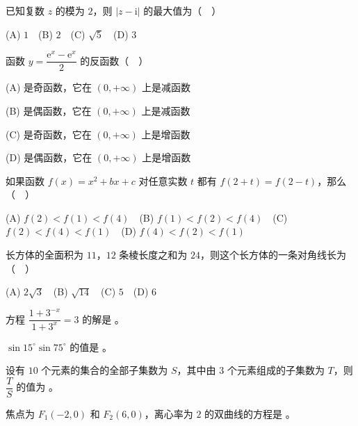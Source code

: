 \begin{question}
已知复数 \(z\) 的模为 \(2\)，则 \(|z-\mathrm{i}|\) 的最大值为（　）

(A) \(1\)　(B) \(2\)　(C) \(\sqrt{5}\)　(D) \(3\)

\end{question}
\begin{question}
函数 \(y=\dfrac{\mathrm{e}^{x}-\mathrm{e}^{x}}{2}\) 的反函数（　）

(A) 是奇函数，它在 \((0,+\infty)\) 上是减函数

(B) 是偶函数，它在 \((0,+\infty)\) 上是减函数

(C) 是奇函数，它在 \((0,+\infty)\) 上是增函数

(D) 是偶函数，它在 \((0,+\infty)\) 上是增函数

\end{question}
\begin{question}
如果函数 \(f(x)=x^{2}+bx+c\) 对任意实数 \(t\) 都有 \(f(2+t)=f(2-t)\)，那么（　）

(A) \(f(2)<f(1)<f(4)\)　(B) \(f(1)<f(2)<f(4)\)　(C) \(f(2)<f(4)<f(1)\)　(D) \(f(4)<f(2)<f(1)\)

\end{question}
\begin{question}
长方体的全面积为 \(11\)，\(12\) 条棱长度之和为 \(24\)，则这个长方体的一条对角线长为（　）

(A) \(2\sqrt{3}\)　(B) \(\sqrt{14}\)　(C) \(5\)　(D) \(6\)

\end{question}
\begin{question}
方程 \(\dfrac{1+3^{-x}}{1+3^{x}}=3\) 的解是 \underline{\qquad}。

\end{question}
\begin{question}
\(\sin 15^{\circ}\sin 75^{\circ}\) 的值是 \underline{\qquad}。

\end{question}
\begin{question}
设有 \(10\) 个元素的集合的全部子集数为 \(S\)，其中由 \(3\) 个元素组成的子集数为 \(T\)，则 $\mbox{\(\dfrac{T}{S}\)}$ 的值为 \underline{\qquad}。

\end{question}
\begin{question}
焦点为 \(F_1(-2,0)\) 和 \(F_2(6,0)\)，离心率为 \(2\) 的双曲线的方程是 \underline{\qquad}。

\end{question}
